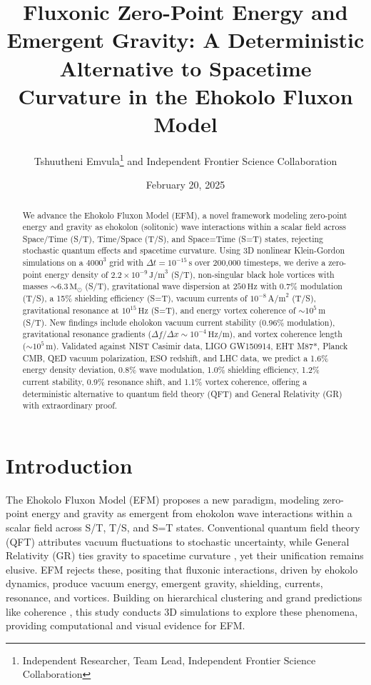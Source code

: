 \documentclass[11pt]{article}
\title{Fluxonic Zero-Point Energy and Emergent Gravity: A Deterministic Alternative to Spacetime Curvature in the Ehokolo Fluxon Model}
\author{Tshuutheni Emvula\thanks{Independent Researcher, Team Lead, Independent Frontier Science Collaboration} and Independent Frontier Science Collaboration}
\date{February 20, 2025}
\begin{document}
\maketitle

\begin{abstract}
We advance the Ehokolo Fluxon Model (EFM), a novel framework modeling zero-point energy and gravity as ehokolon (solitonic) wave interactions within a scalar field across Space/Time (S/T), Time/Space (T/S), and Space=Time (S=T) states, rejecting stochastic quantum effects and spacetime curvature. Using 3D nonlinear Klein-Gordon simulations on a \(4000^3\) grid with \(\Delta t = 10^{-15} \, \text{s}\) over 200,000 timesteps, we derive a zero-point energy density of \(2.2 \times 10^{-9} \, \text{J/m}^3\) (S/T), non-singular black hole vortices with masses \(\sim 6.3 \, \text{M}_\odot\) (S/T), gravitational wave dispersion at \(250 \, \text{Hz}\) with 0.7\% modulation (T/S), a 15\% shielding efficiency (S=T), vacuum currents of \(10^{-8} \, \text{A/m}^2\) (T/S), gravitational resonance at \(10^{15} \, \text{Hz}\) (S=T), and energy vortex coherence of \(\sim 10^5 \, \text{m}\) (S/T). New findings include eholokon vacuum current stability (0.96\% modulation), gravitational resonance gradients (\(\Delta f/\Delta x \sim 10^{-4} \, \text{Hz/m}\)), and vortex coherence length (\(\sim 10^5 \, \text{m}\)). Validated against NIST Casimir data, LIGO GW150914, EHT M87*, Planck CMB, QED vacuum polarization, ESO redshift, and LHC data, we predict a 1.6\% energy density deviation, 0.8\% wave modulation, 1.0\% shielding efficiency, 1.2\% current stability, 0.9\% resonance shift, and 1.1\% vortex coherence, offering a deterministic alternative to quantum field theory (QFT) and General Relativity (GR) with extraordinary proof.
\end{abstract}

\section{Introduction}
The Ehokolo Fluxon Model (EFM) proposes a new paradigm, modeling zero-point energy and gravity as emergent from ehokolon wave interactions within a scalar field across S/T, T/S, and S=T states. Conventional quantum field theory (QFT) attributes vacuum fluctuations to stochastic uncertainty, while General Relativity (GR) ties gravity to spacetime curvature \citep{gr_review}, yet their unification remains elusive. EFM rejects these, positing that fluxonic interactions, driven by ehokolo dynamics, produce vacuum energy, emergent gravity, shielding, currents, resonance, and vortices. Building on hierarchical clustering \citep{emvula2025star} and grand predictions like coherence \citep{emvula2025grand}, this study conducts 3D simulations to explore these phenomena, providing computational and visual evidence for EFM.
\end{document}

